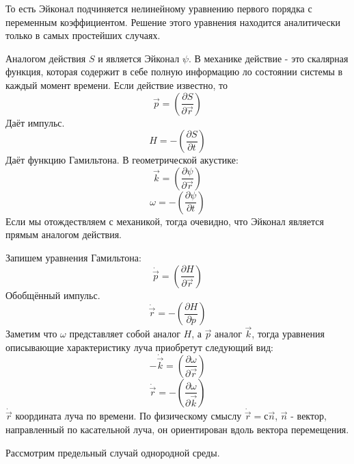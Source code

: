 \documentclass[14pt,a4paper,oneside]{extarticle}	%
\newcommand{\bracket}[1] {\left( #1 \right) } %
\newcommand{\dif}[2] {\bracket{ \frac{\partial #1}{\partial #2} }}
\begin{document}
То есть Эйконал подчиняется нелинейному уравнению первого порядка с переменным коэффициентом.
Решение этого уравнения находится аналитически только в самых простейших случаях.

Аналогом действия  $ S $ и является Эйконал $ \psi $.
В механике действие - это скалярная функция, которая содержит в себе полную информацию ло состоянии системы в каждый момент времени. Если действие известно, то 
\begin{equation*}
\vec{p} = \dif{S}{\vec{r}}
\end{equation*}
Даёт импульс. 
\begin{equation*}
H = -\dif{S}{t}
\end{equation*}
Даёт функцию Гамильтона.
В геометрической акустике:
\begin{equation*}
\vec{k} = \dif{\psi}{\vec{r}}
\end{equation*}
\begin{equation*}
\omega = -\dif{\psi}{t}
\end{equation*}
Если мы отождествляем с механикой, тогда очевидно, что Эйконал является прямым аналогом действия.

Запишем уравнения Гамильтона:
\begin{equation*}
\dot{\vec{p}} = \dif{H}{\vec{r}}
\end{equation*}
Обобщённый импульс.
\begin{equation*}
\dot{\vec{r}} = -\dif{H}{p}
\end{equation*}
Заметим что $ \omega $ представляет собой аналог $ H $, а $ \vec{p} $ аналог $ \vec{k} $, тогда уравнения описывающие характеристику луча приобретут следующий вид:
\begin{equation*}
-\dot{\vec{k}} = \dif{\omega}{\vec{r}}
\end{equation*}
\begin{equation*}
\dot{\vec{r}} = -\dif{\omega}{\vec{k}}
\end{equation*}
$ \dot{\vec{r}} $ координата луча по времени. По физическому смыслу $ \dot{\vec{r}} = с\vec{n} $, $ \vec{n} $ - вектор, направленный по касательной луча, он ориентирован вдоль вектора перемещения.


Рассмотрим предельный случай однородной среды.
 
\end{document}

